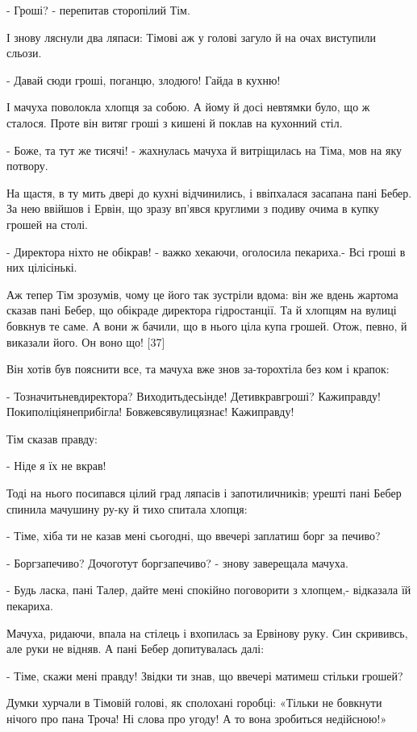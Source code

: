 - Гроші? - перепитав сторопілий Тім.

І знову ляснули два ляпаси: Тімові аж у голові загуло й на очах виступили сльози.

- Давай сюди гроші, поганцю, злодюго! Гайда в кухню!

І мачуха поволокла хлопця за собою. А йому й досі невтямки було, що ж сталося. Проте він витяг гроші з кишені й поклав на кухонний стіл.

- Боже, та тут же тисячі! - жахнулась мачуха й витріщилась на Тіма, мов на яку потвору.

На щастя, в ту мить двері до кухні відчинились, і ввіпхалася засапана пані Бебер. За нею ввійшов і Ервін, що зразу вп'явся круглими з подиву очима в купку грошей на столі.

- Директора ніхто не обікрав! - важко хекаючи, оголосила пекариха.- Всі гроші в них цілісінькі.

Аж тепер Тім зрозумів, чому це його так зустріли вдома: він же вдень жартома сказав пані Бебер, що обікраде директора гідростанції. Та й хлопцям на вулиці бовкнув те саме. А вони ж бачили, що в нього ціла купа грошей. Отож, певно, й виказали його. Он воно що! [37]

Він хотів був пояснити все, та мачуха вже знов за-торохтіла без ком і крапок:

- Тозначитьневдиректора? Виходитьдесьінде! Детивкравгроші? Кажиправду! Покиполіціянеприбігла! Бовжевсявулицязнає! Кажиправду!

Тім сказав правду:

- Ніде я їх не вкрав!

Тоді на нього посипався цілий град ляпасів і запотиличників; урешті пані Бебер спинила мачушину ру-ку й тихо спитала хлопця:

- Тіме, хіба ти не казав мені сьогодні, що ввечері заплатиш борг за печиво?

- Боргзапечиво? Дочоготут боргзапечиво? - знову заверещала мачуха.

- Будь ласка, пані Талер, дайте мені спокійно поговорити з хлопцем,- відказала їй пекариха.

Мачуха, ридаючи, впала на стілець і вхопилась за Ервінову руку. Син скрививсь, але руки не відняв. А пані Бебер допитувалась далі:

- Тіме, скажи мені правду! Звідки ти знав, що ввечері матимеш стільки грошей?

Думки хурчали в Тімовій голові, як сполохані горобці: «Тільки не бовкнути нічого про пана Троча! Ні слова про угоду! А то вона зробиться недійсною!»

